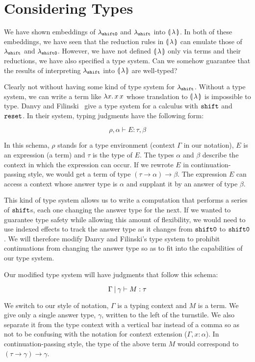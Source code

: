 \section{Considering Types}
\label{sec:considering-types}

We have shown embeddings of $\lambda_{\mathtt{shift0}}$ and $\lambda_{\mathtt{shift}}$ into
$\llparenthesis \, \lambda \, \rrparenthesis$. In both of these embeddings, we have seen that the
reduction rules in $\llparenthesis \, \lambda \, \rrparenthesis$ can emulate those of $\lambda_{\mathtt{shift}}$
and $\lambda_{\mathtt{shift0}}$. However, we have not defined $\llparenthesis \, \lambda \, \rrparenthesis$ only
via terms and their reductions, we have also specified a type system. Can
we somehow guarantee that the results of interpreting $\lambda_{\mathtt{shift}}$ into
$\llparenthesis \, \lambda \, \rrparenthesis$ are well-typed?

Clearly not without having some kind of type system for
$\lambda_{\mathtt{shift}}$. Without a type system, we can write a term like
$\lambda x.\, x\,x$ whose translation to $\llparenthesis \, \lambda \, \rrparenthesis$ is impossible
to type. Danvy and Filinski~\cite{danvy1989functional} give a type system
for a calculus with $\mathtt{shift}$ and $\mathtt{reset}$. In their system, typing
judgments have the following form:

$$
\rho, \alpha \vdash E : \tau, \beta
$$

In this schema, $\rho$ stands for a type environment (context $\Gamma$ in
our notation), $E$ is an expression (a term) and $\tau$ is the type of
$E$. The types $\alpha$ and $\beta$ describe the context in which the
expression can occur. If we rewrote $E$ in continuation-passing style, we
would get a term of type $(\tau \to \alpha) \to \beta$. The expression $E$
can access a context whose answer type is $\alpha$ and supplant it by an
answer of type $\beta$.

This kind of type system allows us to write a computation that performs a
series of $\mathtt{shift}$s, each one changing the answer type for the next. If we
wanted to guarantee type safety while allowing this amount of flexibility,
we would need to use indexed effects \cite{andjelkovic2014towards} to track
the answer type as it changes from $\mathtt{shift0}$ to $\mathtt{shift0}$. We will
therefore modify Danvy and Filinski's type system to prohibit continuations
from changing the answer type so as to fit into the capabilities of our
type system.

Our modified type system will have judgments that follow this schema:

$$
\Gamma \mathbin{|} \gamma \vdash M : \tau
$$

We switch to our style of notation, $\Gamma$ is a typing context and $M$ is
a term. We give only a single answer type, $\gamma$, written to the left of
the turnstile. We also separate it from the type context with a vertical
bar instead of a comma so as not to be confusing with the notation for
context extension ($\Gamma, x : \alpha$). In continuation-passing style,
the type of the above term $M$ would correspond to
$(\tau \to \gamma) \to \gamma$.


